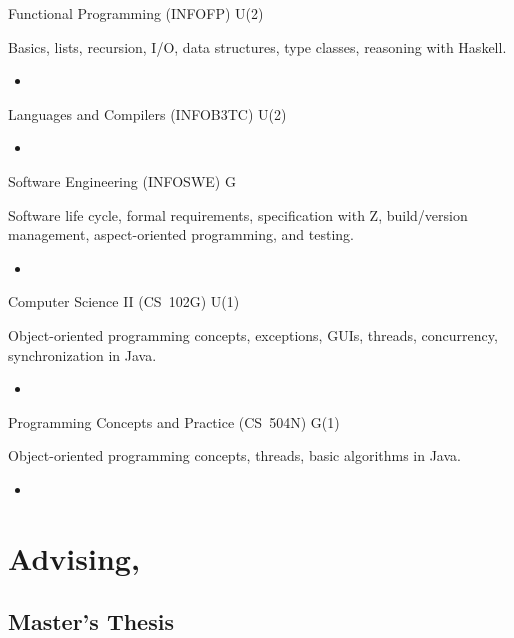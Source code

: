 \documentclass[11pt,a4paper,roman]{moderncv}
\begin{document}
\teachingasstentry%
{Functional Programming (INFOFP)}%
{\uu}%
{U(2)}%
{Basics, lists, recursion, I/O, data structures, type classes, reasoning with Haskell.
\begin{itemize}[leftmargin=2em,nosep]
\item {}
\end{itemize}}

\teachingasstentry%
{Languages and Compilers (INFOB3TC)}%
{\uu}%
{U(2)}%
{\begin{itemize}[leftmargin=2em,nosep]
\item {}
\end{itemize}}

\teachingasstentry%
{Software Engineering (INFOSWE)}%
{\uu}%
{G}%
{Software life cycle, formal requirements, specification with Z, build/version management, aspect-oriented programming, and testing.
\begin{itemize}[leftmargin=2em,nosep]
\item {}
\end{itemize}}

\teachingasstentry%
{Computer Science II (CS~102G)}%
{\wustl}%
{U(1)}%
{Object-oriented programming concepts, exceptions, GUIs, threads, concurrency, synchronization in Java.
\begin{itemize}[leftmargin=2em,nosep]
\item {}
\end{itemize}}

\teachingasstentry%
{Programming Concepts and Practice (CS~504N)}%
{\wustl}%
{G(1)}%
{Object-oriented programming concepts, threads, basic algorithms in Java.
\begin{itemize}[leftmargin=2em,nosep]
\item {}
\end{itemize}}


\section{Advising, \uu}

\subsection{Master's Thesis}

\end{document}
